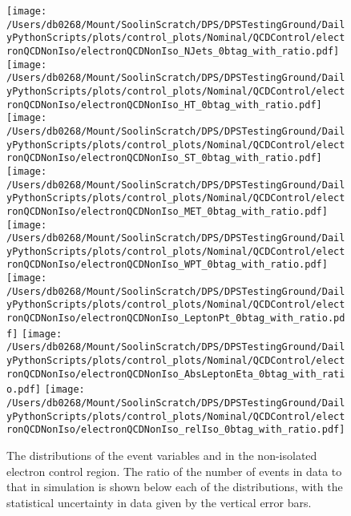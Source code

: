 \begin{figure}[hp]
	\centering
	\texttt{[image: /Users/db0268/Mount/SoolinScratch/DPS/DPSTestingGround/DailyPythonScripts/plots/control\_plots/Nominal/QCDControl/electronQCDNonIso/electronQCDNonIso\_NJets\_0btag\_with\_ratio.pdf]}
	\texttt{[image: /Users/db0268/Mount/SoolinScratch/DPS/DPSTestingGround/DailyPythonScripts/plots/control\_plots/Nominal/QCDControl/electronQCDNonIso/electronQCDNonIso\_HT\_0btag\_with\_ratio.pdf]}
	\texttt{[image: /Users/db0268/Mount/SoolinScratch/DPS/DPSTestingGround/DailyPythonScripts/plots/control\_plots/Nominal/QCDControl/electronQCDNonIso/electronQCDNonIso\_ST\_0btag\_with\_ratio.pdf]} \\
	\texttt{[image: /Users/db0268/Mount/SoolinScratch/DPS/DPSTestingGround/DailyPythonScripts/plots/control\_plots/Nominal/QCDControl/electronQCDNonIso/electronQCDNonIso\_MET\_0btag\_with\_ratio.pdf]}
	\texttt{[image: /Users/db0268/Mount/SoolinScratch/DPS/DPSTestingGround/DailyPythonScripts/plots/control\_plots/Nominal/QCDControl/electronQCDNonIso/electronQCDNonIso\_WPT\_0btag\_with\_ratio.pdf]} \\
	\texttt{[image: /Users/db0268/Mount/SoolinScratch/DPS/DPSTestingGround/DailyPythonScripts/plots/control\_plots/Nominal/QCDControl/electronQCDNonIso/electronQCDNonIso\_LeptonPt\_0btag\_with\_ratio.pdf]} 
	\texttt{[image: /Users/db0268/Mount/SoolinScratch/DPS/DPSTestingGround/DailyPythonScripts/plots/control\_plots/Nominal/QCDControl/electronQCDNonIso/electronQCDNonIso\_AbsLeptonEta\_0btag\_with\_ratio.pdf]}
	\texttt{[image: /Users/db0268/Mount/SoolinScratch/DPS/DPSTestingGround/DailyPythonScripts/plots/control\_plots/Nominal/QCDControl/electronQCDNonIso/electronQCDNonIso\_relIso\_0btag\_with\_ratio.pdf]}
	\caption[The distributions of the event variables and \Irel{} in the non-isolated electron control region. The ratio of the number of events in data to that in simulation is shown below each of the distributions, with the statistical uncertainty in data given by the vertical error bars.]{The distributions of the event variables and \Irel{} in the non-isolated electron control region. The ratio of the number of events in data to that in simulation is shown below each of the distributions, with the statistical uncertainty in data given by the vertical error bars.}
	\label{fig:QCDeNonIso}
\end{figure}
